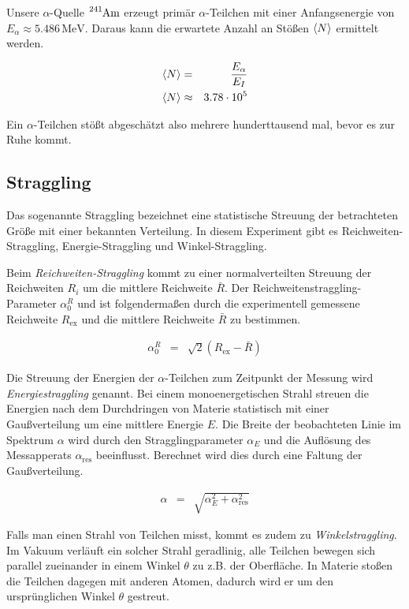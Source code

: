 \documentclass[12pt,a4paper]{scrartcl}
\numberwithin{equation}{section} %
\renewcommand{\[}{} %
\renewcommand{\]}{\noindent} %
\begin{document}
Unsere \(\alpha\)-Quelle \(\ce{^{241}Am}\) erzeugt primär
\(\alpha\)-Teilchen mit einer Anfangsenergie von
\(E_\alpha\approx 5.486 \mathrm{\,MeV}\). Daraus kann die erwartete
Anzahl an Stößen \(\expval{N}\) ermittelt werden.

\[
\begin{eqnarray}
    \expval{N} &=& \frac{E_\alpha}{E_I} \\
    \expval{N} &\approx& 3.78 \cdot 10^5
\end{eqnarray}
\]

\noindent
Ein \(\alpha\)-Teilchen stößt abgeschätzt also mehrere hunderttausend
mal, bevor es zur Ruhe kommt.

\hypertarget{straggling}{%
\subsection{Straggling}\label{straggling}}

Das sogenannte Straggling bezeichnet
eine statistische Streuung der betrachteten Größe mit einer bekannten
Verteilung. In diesem Experiment gibt es Reichweiten-Straggling,
Energie-Straggling und Winkel-Straggling.

Beim \emph{Reichweiten-Straggling} kommt zu einer normalverteilten
Streuung der Reichweiten \(R_i\) um die mittlere Reichweite \(\bar{R}\).
Der Reichweitenstraggling-Parameter \(\alpha^R_0\) und ist
folgendermaßen durch die experimentell gemessene Reichweite
\(R_\mathrm{ex}\) und die mittlere Reichweite \(\bar{R}\) zu bestimmen.

\[
\begin{eqnarray}
    \alpha^R_0 &=& \sqrt{2}\left(R_\mathrm{ex}-\bar{R}\right)
\end{eqnarray}
\]

Die Streuung der Energien der \(\alpha\)-Teilchen zum Zeitpunkt der
Messung wird \emph{Energiestraggling} genannt. Bei einem
monoenergetischen Strahl streuen die Energien nach dem Durchdringen von
Materie statistisch mit einer Gaußverteilung um eine mittlere Energie
\(E\). Die Breite der beobachteten Linie im Spektrum \(\alpha\) wird
durch den Stragglingparameter \(\alpha_E\) und die Auflösung des
Messapperats \(\alpha_\mathrm{res}\) beeinflusst. Berechnet wird dies
durch eine Faltung der Gaußverteilung.

\[
\begin{eqnarray}
    \alpha &=& \sqrt{\alpha_E^2 + \alpha_\mathrm{res}^2}
\end{eqnarray}
\]

Falls man einen Strahl von Teilchen misst, kommt es zudem zu
\emph{Winkelstraggling}. Im Vakuum verläuft ein solcher Strahl
geradlinig, alle Teilchen bewegen sich parallel zueinander in einem
Winkel \(\theta\) zu z.B. der Oberfläche. In Materie stoßen die Teilchen
dagegen mit anderen Atomen, dadurch wird er um den ursprünglichen Winkel
\(\theta\) gestreut.
\end{document}
